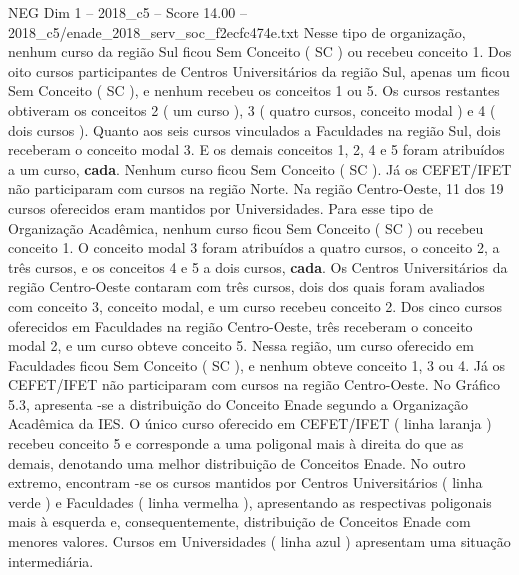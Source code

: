 \begin{textsample}{NEG Dim 1 – 2018\_c5 – Score 14.00 – 2018\_c5/enade\_2018\_serv\_soc\_f2ecfc474e.txt}
Nesse tipo de organização, nenhum curso da região Sul ficou Sem Conceito ( SC ) ou recebeu conceito 1.
Dos oito cursos participantes de Centros Universitários da região Sul, apenas um ficou Sem Conceito ( SC ), e nenhum recebeu os conceitos 1 ou 5.
Os cursos restantes obtiveram os conceitos 2 ( um curso ), 3 ( quatro cursos, conceito modal ) e 4 ( dois cursos ).
Quanto aos seis cursos vinculados a Faculdades na região Sul, dois receberam o conceito modal 3.
E os demais conceitos 1, 2, 4 e 5 foram atribuídos a um curso, \textbf{cada}.
Nenhum curso ficou Sem Conceito ( SC ).
Já os CEFET/IFET não participaram com cursos na região Norte.
Na região Centro-Oeste, 11 dos 19 cursos oferecidos eram mantidos por Universidades.
Para esse tipo de Organização Acadêmica, nenhum curso ficou Sem Conceito ( SC ) ou recebeu conceito 1.
O conceito modal 3 foram atribuídos a quatro cursos, o conceito 2, a três cursos, e os conceitos 4 e 5 a dois cursos, \textbf{cada}.
Os Centros Universitários da região Centro-Oeste contaram com três cursos, dois dos quais foram avaliados com conceito 3, conceito modal, e um curso recebeu conceito 2.
Dos cinco cursos oferecidos em Faculdades na região Centro-Oeste, três receberam o conceito modal 2, e um curso obteve conceito 5.
Nessa região, um curso oferecido em Faculdades ficou Sem Conceito ( SC ), e nenhum obteve conceito 1, 3 ou 4.
Já os CEFET/IFET não participaram com cursos na região Centro-Oeste.
No Gráfico 5.3, apresenta -se a distribuição do Conceito Enade segundo a Organização Acadêmica da IES.
O único curso oferecido em CEFET/IFET ( linha laranja ) recebeu conceito 5 e corresponde a uma poligonal mais à direita do que as demais, denotando uma melhor distribuição de Conceitos Enade.
No outro extremo, encontram -se os cursos mantidos por Centros Universitários ( linha verde ) e Faculdades ( linha vermelha ), apresentando as respectivas poligonais mais à esquerda e, consequentemente, distribuição de Conceitos Enade com menores valores.
Cursos em Universidades ( linha azul ) apresentam uma situação intermediária.

\end{textsample}
